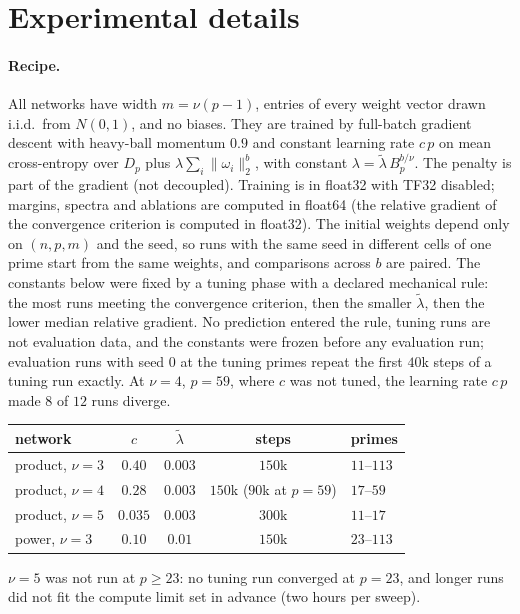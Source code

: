 \section{Experimental details}\label{app:exp}

\paragraph{Recipe.} All networks have width $m=\nu(p-1)$, entries of every weight vector drawn i.i.d.\ from $N(0,1)$, and no biases. They are trained by full-batch gradient descent with heavy-ball momentum $0.9$ and constant learning rate $c\,p$ on mean cross-entropy over $D_p$ plus $\lambda\sum_i\|\omega_i\|_2^b$, with constant $\lambda=\tilde\lambda\,B_p^{b/\nu}$. The penalty is part of the gradient (not decoupled). Training is in float32 with TF32 disabled; margins, spectra and ablations are computed in float64 (the relative gradient of the convergence criterion is computed in float32). The initial weights depend only on $(n,p,m)$ and the seed, so runs with the same seed in different cells of one prime start from the same weights, and comparisons across $b$ are paired. The constants below were fixed by a tuning phase with a declared mechanical rule: the most runs meeting the convergence criterion, then the smaller $\tilde\lambda$, then the lower median relative gradient. No prediction entered the rule, tuning runs are not evaluation data, and the constants were frozen before any evaluation run; evaluation runs with seed $0$ at the tuning primes repeat the first $40$k steps of a tuning run exactly. At $\nu=4$, $p=59$, where $c$ was not tuned, the learning rate $c\,p$ made $8$ of $12$ runs diverge.

\begin{center}
\small
\begin{tabular}{lcccl}
\toprule
network & $c$ & $\tilde\lambda$ & steps & primes\\
\midrule
product, $\nu=3$ & $0.40$ & $0.003$ & $150$k & $11$--$113$\\
product, $\nu=4$ & $0.28$ & $0.003$ & $150$k ($90$k at $p=59$) & $17$--$59$\\
product, $\nu=5$ & $0.035$ & $0.003$ & $300$k & $11$--$17$\\
power, $\nu=3$ & $0.10$ & $0.01$ & $150$k & $23$--$113$\\
\bottomrule
\end{tabular}
\end{center}

$\nu=5$ was not run at $p\ge23$: no tuning run converged at $p=23$, and longer runs did not fit the compute limit set in advance (two hours per sweep).

